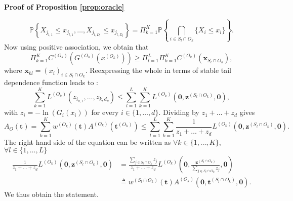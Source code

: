 \documentclass[11pt]{article}
\makeatletter
\renewenvironment{proof}[1][\proofname]{\par
\pushQED{\qed}%
\normalfont \topsep6\p@\@plus6\p@\relax
\trivlist
\item\relax
{\textbf{
#1\@addpunct{ }}}\hspace\labelsep\ignorespaces
}{%
\popQED\endtrivlist\@endpefalse
}
\makeatother
\begin{document}
\begin{proof}[Proof of Proposition \ref{prop:oracle}]
\begin{equation*}
			\mathbb{P}\left\{ X_{j_{l,1}} \leq x_{j_{l,1}}, \dots, X_{j_{l,D_l}} \leq x_{j_{l,D_l}} \right\} = \Pi_{k=1}^K \mathbb{P}\left\{ \bigcap_{i \in S_l \cap O_k } \{X_i \leq x_i \} \right\}.
		\end{equation*}
		Now using positive association, we obtain that
		\begin{equation*}
			\Pi_{k=1}^K C^{(O_k)}\left( G^{(O_k)}(x^{(O_k)})\right) \geq \Pi_{l=1}^L \Pi_{k=1}^K C^{(O_k)}\left(\textbf{x}_{S_l \cap O_k} \right),
		\end{equation*}
		where $\textbf{x}_{kl} = (x_i)_{i \in S_l \cap O_k}$. Reexpressing the whole in terms of stable tail dependence function leads to :
		\begin{equation*}
			\sum_{k=1}^K L^{(O_k)}(z_{i_{k,1}},\dots, z_{k,d_k}) \leq \sum_{l=1}^L \sum_{k=1}^K L^{(O_k)}(\textbf{0}, \textbf{z}^{(S_l \cap O_k)}, \textbf{0}),
		\end{equation*}
		with $z_i = -\ln (G_i(x_i))$ for every $i \in \{1, \dots, d\}$. Dividing by $z_1 + \dots + z_d$ gives
		\begin{equation*}
			A_{O} (\textbf{t}) = \sum_{k=1}^K w^{(O_k)}(\textbf{t}) A^{(O_k)}(\textbf{t}^{(O_k)}) \leq \sum_{l=1}^L \sum_{k=1}^K \frac{1}{z_1+\dots+z_d}L^{(O_k)}(\textbf{0}, \textbf{z}^{(S_l \cap O_k)}, \textbf{0}).
		\end{equation*}
		The right hand side of the equation can be written as $\forall k \in \{1,\dots, K\}$, $\forall l \in \{1,\dots, L\}$
		\begin{align*}
			\frac{1}{z_1 + \dots + z_d} L^{(O_k)}(\textbf{0}, \textbf{z}^{(S_l \cap O_k)}, \textbf{0}) &= \frac{\sum_{j \in S_l \cap O_k} z_j}{z_1 + \dots + z_d} L^{(O_k)}\left(\textbf{0}, \frac{\textbf{z}^{(S_l \cap O_k)}}{\sum_{j \in S_l \cap O_k} z_j}, \textbf{0}\right) \\
			&\triangleq w^{(S_l \cap O_k)}(\textbf{t}) A^{(O_k)}(\textbf{0}, \textbf{t}^{(S_l \cap O_k)}, \textbf{0}).
		\end{align*}
		We thus obtain the statement.
		

\end{proof}
\end{document}

